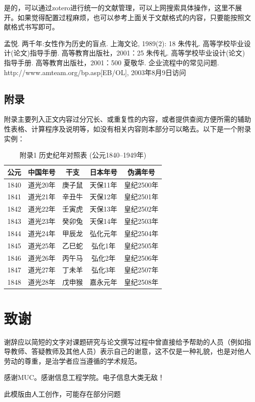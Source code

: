\documentclass[12pt,a4paper]{ctexart}
\begin{document}
是的，可以通过zotero进行统一的文献管理，可以上网搜索具体操作，这里不展开。如果觉得配置过程麻烦，也可以参考上面关于文献格式的内容，只要能按照文献格式书写即可。

\newpage
{}
\begin{thebibliography}{99}
    孟悦. 两千年:女性作为历史的盲点. 上海文论, 1989(2): 18
    朱传礼. 高等学校毕业设计(论文)指导手册. 高等教育出版社，2001：25
    朱传礼. 高等学校毕业设计(论文)指导手册. 高等教育出版社，2001：500
    夏敬华. 企业流程中的常见问题. http://www.amteam.org/bp.asp[EB/OL], 2003年8月9日访问
\end{thebibliography}

\newpage
\begin{appendices}
	\renewcommand{\thesection}{\Alph{section}}
    \captionsetup[table]{labelformat=empty,list=no} %
	\section{附录}
	附录主要列入正文内容过分冗长、或重复性的内容，或者提供查阅方便所需的辅助性表格、计算程序及说明等，如没有相关内容则本部分可以略去。以下是一个附录实例：

    \begin{table}[h]
    \centering
    \caption{附录1 历史纪年对照表 (公元1840--1949年)}
    \begin{tabular}{|c|c|c|c|c|}
    \hline
    公元 & 中国年号 & 干支 & 日本年号 & 伪满年号 \\
    \hline
    1840 & 道光20年 & 庚子鼠 & 天保11年 & 皇纪2500年 \\
    \hline
    1841 & 道光21年 & 辛丑牛 & 天保12年 & 皇纪2501年 \\
    \hline
    1842 & 道光22年 & 壬寅虎 & 天保13年 & 皇纪2502年 \\
    \hline
    1843 & 道光23年 & 癸卯兔 & 天保14年 & 皇纪2503年 \\
    \hline
    1844 & 道光24年 & 甲辰龙 & 弘化元年 & 皇纪2504年 \\
    \hline
    1845 & 道光25年 & 乙巳蛇 & 弘化1年 & 皇纪2505年 \\
    \hline
    1846 & 道光26年 & 丙午马 & 弘化2年 & 皇纪2506年 \\
    \hline
    1847 & 道光27年 & 丁未羊 & 弘化3年 & 皇纪2507年 \\
    \hline
    1848 & 道光28年 & 戊申猴 & 嘉永元年 & 皇纪2508年 \\
    \hline
    \end{tabular}
    \end{table}

\end{appendices}

\newpage
\section*{致谢}
谢辞应以简短的文字对课题研究与论文撰写过程中曾直接给予帮助的人员（例如指导教师、答疑教师及其他人员）表示自己的谢意，这不仅是一种礼貌，也是对他人劳动的尊重，是治学者应当遵循的学术规范。

感谢MUC。感谢信息工程学院。电子信息大类无敌！

此模版由人工创作，可能存在部分问题
\end{document}
